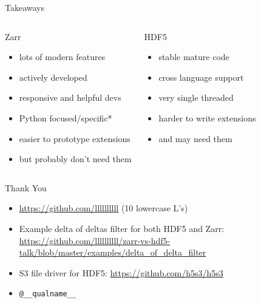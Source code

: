 \documentclass{beamer}
\begin{document}
\begin{frame}{Takeaways}
  \begin{columns}
    \begin{block}{Zarr}
      \begin{itemize}
      \item lots of modern features
      \item actively developed
      \item responsive and helpful devs
      \item Python focused/specific*
      \item easier to prototype extensions
      \item but probably don't need them
      \end{itemize}
    \end{block}

    \begin{block}{HDF5}
      \begin{itemize}
      \item stable mature code
      \item cross language support
      \item very single threaded
      \item harder to write extensions
      \item and may need them
      \end{itemize}
    \end{block}
  \end{columns}
\end{frame}

\begin{frame}{Thank You}
  \begin{itemize}
  \item \url{https://github.com/llllllllll} (10 lowercase L's)
  \item Example delta of deltas filter for both HDF5 and Zarr:
    \url{https://github.com/llllllllll/zarr-vs-hdf5-talk/blob/master/examples/delta_of_delta_filter}
  \item S3 file driver for HDF5: \url{https://github.com/h5s3/h5s3}
  \item \texttt{@\_\_qualname\_\_}
  \end{itemize}
\end{frame}
\end{document}
